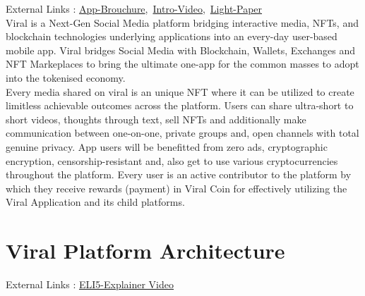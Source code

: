 \documentclass[10pt]{article}
\begin{document}
External Links : \hyperlink{https://sample.com}{App-Brouchure},\ \hyperlink{https://sample.com}{Intro-Video},\ \hyperlink{https://sample.com}{Light-Paper}\\


Viral is a Next-Gen Social Media platform bridging interactive media, NFTs, and blockchain technologies\textsc{} underlying applications into an every-day user-based mobile app. Viral bridges Social Media with Blockchain, Wallets, Exchanges and NFT Markeplaces to bring the ultimate one-app for the common masses to adopt into the tokenised economy.\\

Every media shared on viral is an unique NFT where it can be utilized to create limitless achievable outcomes across the platform. Users can share ultra-short to short videos, thoughts through text, sell NFTs and additionally make communication between one-on-one, private groups and, open channels with total genuine privacy. App users will be benefitted from zero ads, cryptographic encryption, censorship-resistant and, also get to use various cryptocurrencies throughout the platform. Every user is an active contributor to the platform by which they receive rewards (payment) in Viral Coin for effectively utilizing the Viral Application and it\textsc{}s child platforms.\\

\section{Viral Platform Architecture}

External Links : \hyperlink{https://sample.com}{ELI5-Explainer Video}\\
\end{document}
